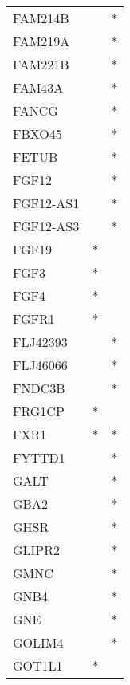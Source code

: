 \begin{longtable}{lcc}
FAM214B          &                &          * \\
FAM219A          &                &          * \\
FAM221B          &                &          * \\
FAM43A           &                &          * \\
FANCG            &                &          * \\
FBXO45           &                &          * \\
FETUB            &                &          * \\
FGF12            &                &          * \\
FGF12-AS1        &                &          * \\
FGF12-AS3        &                &          * \\
FGF19            &              * &            \\
FGF3             &              * &            \\
FGF4             &              * &            \\
FGFR1            &              * &            \\
FLJ42393         &                &          * \\
FLJ46066         &                &          * \\
FNDC3B           &                &          * \\
FRG1CP           &              * &            \\
FXR1             &              * &          * \\
FYTTD1           &                &          * \\
GALT             &                &          * \\
GBA2             &                &          * \\
GHSR             &                &          * \\
GLIPR2           &                &          * \\
GMNC             &                &          * \\
GNB4             &                &          * \\
GNE              &                &          * \\
GOLIM4           &                &          * \\
GOT1L1           &              * &            \\

\end{longtable}
